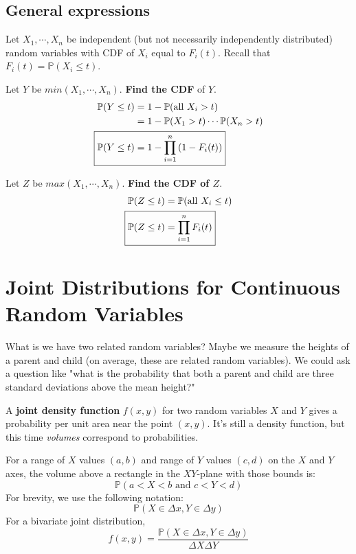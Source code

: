 \documentclass[titlepage, 12pt, leqno]{article}
\begin{document}
\subsection{General expressions}
Let $X_1, \cdots , X_n$ be independent (but not necessarily independently 
distributed) random variables with CDF of $X_i$ equal to $F_i(t)$. Recall that
$F_i(t) = \mathbb{P}(X_i \le t)$. 
\begin{ex}
    Let $Y$ be $min(X_1, \cdots , X_n)$. \textbf{Find the CDF} of $Y$.
   \begin{align*}
       \mathbb{P}(Y\le t) &= 1 - \mathbb{P}( \text{all $X_i>t$}) \\
                          &= 1 - \mathbb{P}(X_1>t) \cdots \mathbb{P}(X_n > t) \\
       \Aboxed{\mathbb{P}(Y \le t)&= 1 - \prod_{i=1}^n\left(1-F_i(t)\right)}
   \end{align*}
\end{ex}

\begin{ex}
    Let $Z$ be $max(X_1, \cdots , X_n)$. \textbf{Find the CDF of $Z$}.
   \begin{align*}
       \mathbb{P}(Z \le t) &= \mathbb{P}( \text{all $X_i \le t$}) \\
       \Aboxed{\mathbb{P}(Z \le t) &= \prod_{i=1}^{n}F_i(t)}
   \end{align*}
\end{ex}

\pagebreak
\section{Joint Distributions for Continuous Random Variables}
What is we have two related random variables? Maybe we measure the heights of a
parent and child (on average, these are related random variables). We could ask a
question like "what is the probability that both a parent and child are three
standard deviations above the mean height?"
\begin{definition}
    A \textbf{joint density function} $f(x,y)$ for two random variables $X$ and
    $Y$ gives a probability per unit area near the point $(x,y)$. It's still a
    density function, but this time \textit{volumes} correspond to probabilities.
\end{definition}

For a range of $X$ values $(a,b)$ and range of $Y$ values $(c,d)$ on the $X$ and
$Y$ axes, the volume above a rectangle in the $XY$-plane with those bounds is:
\[
    \mathbb{P}(a<X<b \text{ and } c<Y<d)
\]
For brevity, we use the following notation:
\[
    \mathbb{P}(X \in \Delta x, Y \in \Delta y)
\]
For a bivariate joint distribution, 
\[
    \boxed{f(x,y) = \frac{\mathbb{P}(X \in \Delta x, Y \in \Delta y)}{\Delta X 
            \Delta Y}} 
\]
\end{document}
